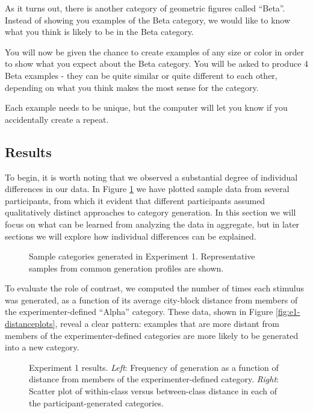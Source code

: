\documentclass[12pt]{article}
\newcommand\inputpgf[2]{{
\let\pgfimageWithoutPath\pgfimage
\renewcommand{\pgfimage}[2][]{\pgfimageWithoutPath[##1]{#1/##2}}

}}
\begin{document}
\begin{flushleft}
\begin{displayquote}
As it turns out, there is another category of geometric figures called ``Beta''. Instead of showing you examples of the Beta category, we would like to know what you think is likely to be in the Beta category. 

You will now be given the chance to create examples of any size or color in order to show what you expect about the Beta category. You will be asked to produce 4 Beta examples - they can be quite similar or quite different to each other, depending on what you think makes the most sense for the category.

Each example needs to be unique, but the computer will let you know if you accidentally create a repeat.
\end{displayquote}


\subsection{Results}

To begin, it is worth noting that we observed a substantial degree of individual differences in our data. In Figure \ref{fig:e1-samples} we have plotted sample data from several participants, from which it evident that different participants assumed qualitatively distinct approaches to category generation. In this section we will focus on what can be learned from analyzing the data in aggregate, but in later sections we will explore how individual differences can be explained.

\begin{figure}
    \begin{center}
    \inputpgf{figs/}{e1-samples.pgf}
    \caption{Sample categories generated in Experiment 1. Representative samples from common generation profiles are shown.}
    \label{fig:e1-samples}
    \end{center}
\end{figure}

To evaluate the role of contrast, we computed the number of times each stimulus was generated, as a function of its average city-block distance from members of the experimenter-defined ``Alpha'' category. These data, shown in Figure \ref{fig:e1-distanceplots}, reveal a clear pattern: examples that are more distant from members of the experimenter-defined categories are more likely to be generated into a new category. 

\begin{figure}
    \begin{center}
    \inputpgf{figs/}{e1-distanceplots.pgf}
    \caption{Experiment 1 results. \textit{Left}: Frequency of generation as a function of distance from members of the experimenter-defined category. \textit{Right}: Scatter plot of within-class versus between-class distance in each of the participant-generated categories.}


\end{center}
\end{figure}
\end{flushleft}
\end{document}
